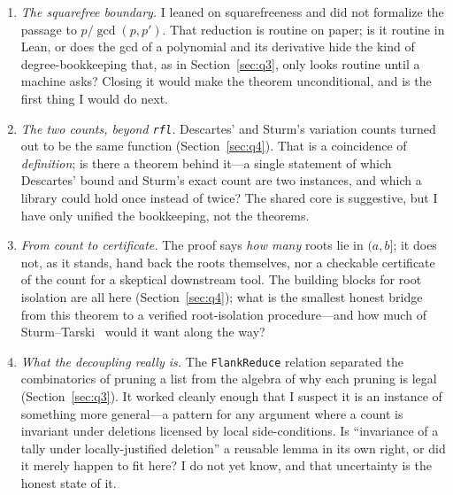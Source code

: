 \documentclass[11pt]{article}
\newcommand{\lean}[1]{\texttt{#1}}
\begin{document}
\begin{enumerate}\itemsep3pt
\item \emph{The squarefree boundary.} I leaned on squarefreeness and did not formalize the passage
to $p/\gcd(p,p')$. That reduction is routine on paper; is it routine in Lean, or does the gcd of a
polynomial and its derivative hide the kind of degree-bookkeeping that, as in
Section~\ref{sec:q3}, only looks routine until a machine asks? Closing it would make the theorem
unconditional, and is the first thing I would do next.

\item \emph{The two counts, beyond \lean{rfl}.} Descartes' and Sturm's variation counts turned out
to be the same function (Section~\ref{sec:q4}). That is a coincidence of \emph{definition}; is there
a theorem behind it---a single statement of which Descartes' bound and Sturm's exact count are two
instances, and which a library could hold once instead of twice? The shared core is suggestive, but
I have only unified the bookkeeping, not the theorems.

\item \emph{From count to certificate.} The proof says \emph{how many} roots lie in $(a,b]$; it does
not, as it stands, hand back the roots themselves, nor a checkable certificate of the count for a
skeptical downstream tool. The building blocks for root isolation are all here
(Section~\ref{sec:q4}); what is the smallest honest bridge from this theorem to a verified
root-isolation procedure---and how much of Sturm--Tarski~\cite{libudan} would it want along the way?

\item \emph{What the decoupling really is.} The \lean{FlankReduce} relation separated the
combinatorics of pruning a list from the algebra of why each pruning is legal
(Section~\ref{sec:q3}). It worked cleanly enough that I suspect it is an instance of something more
general---a pattern for any argument where a count is invariant under deletions licensed by local
side-conditions. Is ``invariance of a tally under locally-justified deletion'' a reusable lemma in
its own right, or did it merely happen to fit here? I do not yet know, and that uncertainty is the
honest state of it.
\end{enumerate}
\end{document}

